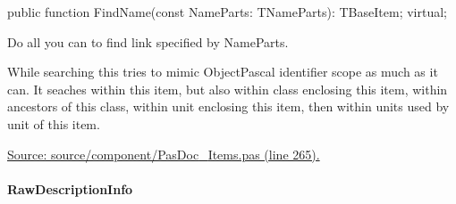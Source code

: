 \documentclass{report}
\newif\ifpdf
\begin{document}
\label{PasDoc_Items.TBaseItem-FindName}
\begin{list}{}{
\setlength{\itemindent}{0cm}
\setlength{\listparindent}{0cm}
\setlength{\leftmargin}{\evensidemargin}
\addtolength{\leftmargin}{\tmplength}
\settowidth{\labelsep}{X}
\addtolength{\leftmargin}{\labelsep}
\setlength{\labelwidth}{\tmplength}
}
\item[\textbf{Declaration}\hfill]
\ifpdf
\begin{flushleft}
\fi
\begin{ttfamily}
public function FindName(const NameParts: TNameParts): TBaseItem; virtual;\end{ttfamily}

\ifpdf
\end{flushleft}
\fi

\par
\item[\textbf{Description}]
Do all you can to find link specified by NameParts.

While searching this tries to mimic ObjectPascal identifier scope as much as it can. It seaches within this item, but also within class enclosing this item, within ancestors of this class, within unit enclosing this item, then within units used by unit of this item.\par
\href{https://github.com/pasdoc/pasdoc/blob/master/source/component/PasDoc_Items.pas#L265}{Source: source/component/PasDoc{\_}Items.pas (line 265).}

\end{list}
\paragraph*{RawDescriptionInfo}\hspace*{\fill}
\end{document}
